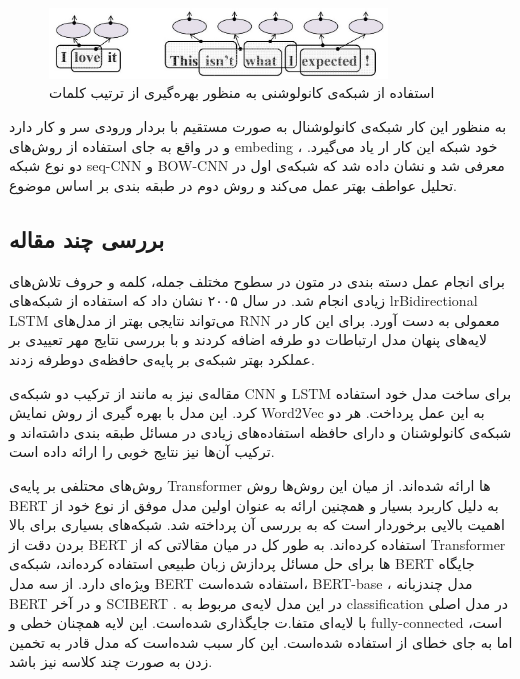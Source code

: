 \documentclass[12pt, a4paper, oneside]{report}
\begin{document}
\begin{figure}[h]
    \centering
    \includegraphics[width=0.8\textwidth]{cnn-in-text}
    \caption{ استفاده از شبکه‌ی کانولوشنی به منظور بهره‌گیری از ترتیب کلمات }
    \label{fig:cnn-in-text}
\end{figure}

به منظور این کار شبکه‌ی کانولوشنال به صورت مستقیم با بردار ورودی سر و کار دارد و در واقع به جای استفاده از
روش‌های
embeding
، خود شبکه این کار ار یاد می‌گیرد. دو نوع شبکه
seq-CNN
و
BOW-CNN
معرفی شد و نشان داده شد که شبکه‌ی اول در تحلیل عواطف بهتر عمل می‌کند و روش دوم در طبقه بندی بر اساس موضوع.
\cite{johnson-zhang-2015-effective}

\subsection{بررسی چند مقاله}

برای انجام عمل دسته بندی در متون در سطوح مختلف جمله، کلمه و حروف تلاش‌های زیادی انجام شد.
\cite{graves2005framewise}
در سال ۲۰۰۵ نشان داد که استفاده از شبکه‌های
lr{Bidirectional LSTM}
می‌تواند نتایجی بهتر از مدل‌های
RNN
معمولی به دست آورد. برای این کار در لایه‌های پنهان مدل ارتباطات دو طرفه اضافه کردند و با بررسی نتایج مهر تعییدی
بر عملکرد بهتر شبکه‌ی بر پایه‌ی حافظه‌ی دوطرفه زدند.

مقاله‌ی
\cite{guggilla-etal-2016-cnn}
نیز به مانند 
\cite{wang-etal-2016-combination}
از ترکیب دو شبکه‌ی
CNN
و
LSTM
برای ساخت مدل خود استفاده کرد. این مدل با بهره گیری از روش نمایش
Word2Vec
به این عمل پرداخت. هر دو شبکه‌ی کانولوشنان و دارای حافظه استفاده‌های زیادی در مسائل طبقه بندی داشته‌اند و ترکیب آن‌ها
نیز نتایج خوبی را ارائه داده است.

روش‌های محتلفی بر پایه‌ی
Transformer
ها ارائه شده‌اند. از میان این روش‌ها روش
BERT
به دلیل کاربرد بسیار و همچنین ارائه به عنوان اولین مدل موفق از نوع خود از اهمیت بالایی برخوردار است که به بررسی آن
پرداخته شد. شبکه‌های بسیاری برای بالا بردن دقت از
BERT
استفاده کرده‌اند. به طور کل در میان مقالاتی که از
Transformer
ها برای حل مسائل پردازش زبان طبیعی استفاده کرده‌اند، شبکه‌ی
BERT
جایگاه ویژه‌ای دارد.
\cite{schmidt2020data}
از سه مدل
BERT
استفاده شده‌است،
BERT-base
، مدل چندزبانه
BERT
و در آخر
SCIBERT
.
در این مدل لایه‌ی مربوط به
classification
در مدل اصلی با لایه‌ای متفا.ت جایگذاری شده‌است. این لایه همچنان خطی و
fully-connected
است، اما به جای خطای
از
استفاده شده‌است. این کار سبب شده‌است که مدل قادر به تخمین زدن به صورت چند کلاسه نیز باشد.
\end{document}
